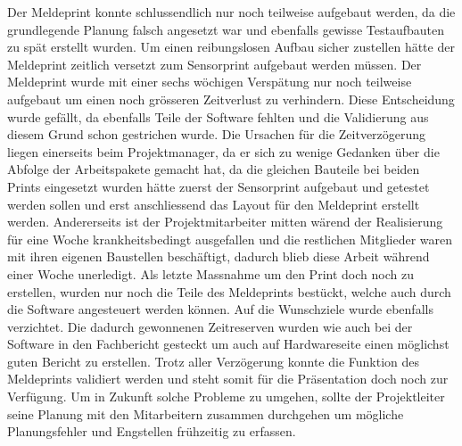 Der Meldeprint konnte schlussendlich nur noch teilweise aufgebaut werden, da die grundlegende Planung falsch angesetzt war und ebenfalls gewisse Testaufbauten zu spät erstellt wurden. Um einen reibungslosen Aufbau sicher zustellen hätte der Meldeprint zeitlich versetzt zum Sensorprint aufgebaut werden müssen. \newline
Der Meldeprint wurde mit einer sechs wöchigen Verspätung nur noch teilweise aufgebaut um einen noch grösseren Zeitverlust zu verhindern. Diese Entscheidung wurde gefällt, da ebenfalls Teile der Software fehlten und die Validierung aus diesem Grund schon gestrichen wurde.  \newline
Die Ursachen für die Zeitverzögerung liegen einerseits beim Projektmanager, da er sich zu wenige Gedanken über die Abfolge der Arbeitspakete gemacht hat, da die gleichen Bauteile bei beiden Prints eingesetzt wurden hätte zuerst der Sensorprint aufgebaut und getestet werden sollen und erst anschliessend das Layout für den Meldeprint erstellt werden. Andererseits ist der Projektmitarbeiter mitten wärend der Realisierung für eine Woche krankheitsbedingt ausgefallen und die restlichen Mitglieder waren mit ihren eigenen Baustellen beschäftigt, dadurch blieb diese Arbeit während einer Woche unerledigt. \newline
Als letzte Massnahme um den Print doch noch zu erstellen, wurden nur noch die Teile des Meldeprints bestückt, welche auch durch die Software angesteuert werden können. Auf die Wunschziele wurde ebenfalls verzichtet. \newline
Die dadurch gewonnenen Zeitreserven wurden wie auch bei der Software in den Fachbericht gesteckt um auch auf Hardwareseite einen möglichst guten Bericht zu erstellen. Trotz aller Verzögerung konnte die Funktion des Meldeprints validiert werden und steht somit für die Präsentation doch noch zur Verfügung.\newline
Um in Zukunft solche Probleme zu umgehen, sollte der Projektleiter seine Planung mit den Mitarbeitern zusammen durchgehen um mögliche Planungsfehler und Engstellen frühzeitig zu erfassen. 
